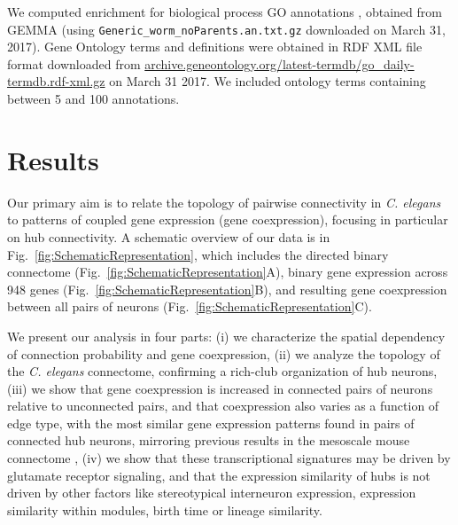 \documentclass[10pt,letterpaper]{article}
\begin{document}
We computed enrichment for biological process GO annotations \cite{Ashburner2000}, obtained from GEMMA \cite{Zoubarev2012} (using \texttt{Generic\_worm\_noParents.an.txt.gz} downloaded on March 31, 2017).
Gene Ontology terms and definitions were obtained in RDF XML file format downloaded from \url{archive.geneontology.org/latest-termdb/go_daily-termdb.rdf-xml.gz} on March 31 2017.
We included ontology terms containing between 5 and 100 annotations.


\section*{Results}

Our primary aim is to relate the topology of pairwise connectivity in \emph{C. elegans} to patterns of coupled gene expression (gene coexpression), focusing in particular on hub connectivity.
A schematic overview of our data is in Fig.~\ref{fig:SchematicRepresentation}, which includes the directed binary connectome (Fig.~\ref{fig:SchematicRepresentation}A), binary gene expression across 948 genes (Fig.~\ref{fig:SchematicRepresentation}B), and resulting gene coexpression between all pairs of neurons (Fig.~\ref{fig:SchematicRepresentation}C).

We present our analysis in four parts:
(i) we characterize the spatial dependency of connection probability and gene coexpression,
(ii) we analyze the topology of the \emph{C. elegans} connectome, confirming a rich-club organization of hub neurons,
(iii) we show that gene coexpression is increased in connected pairs of neurons relative to unconnected pairs, and that coexpression also varies as a function of edge type, with the most similar gene expression patterns found in pairs of connected hub neurons, mirroring previous results in the mesoscale mouse connectome \cite{Fulcher:2016ck},
(iv) we show that these transcriptional signatures may be driven by glutamate receptor signaling, and that the expression similarity of hubs is not driven by other factors like stereotypical interneuron expression, expression similarity within modules, birth time or lineage similarity.
\end{document}
